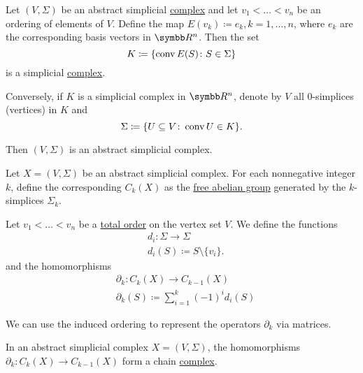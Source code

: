 \begin{Proposition}\label{thm:abstract_simplicial_complex_iff_simplicial_complex}
  Let \( (V, \Sigma) \) be an abstract simplicial \hyperref[def:abstract_simplicial_complex]{complex} and let \( v_1 < \ldots < v_n \) be an ordering of elements of \( V \). Define the map \( E(v_k) \coloneqq e_k, k = 1, \ldots, n \), where \( e_k \) are the corresponding basis vectors in \( \BB{R^n} \). Then the set
  \begin{equation*}
    K \coloneqq \{ \operatorname{conv} E(S) \colon S \in \Sigma \}
  \end{equation*}
  is a simplicial \hyperref[def:simplicial_complex]{complex}.

  Conversely, if \( K \) is a simplicial complex in \( \BB{R^n} \), denote by \( V \) all \( 0 \)-simplices (vertices) in \( K \) and
  \begin{equation*}
    \Sigma \coloneqq \{ U \subseteq V \colon \operatorname{conv} U \in K \}.
  \end{equation*}

  Then \( (V, \Sigma) \) is an abstract simplicial complex.
\end{Proposition}

\begin{Definition}\label{def:group_of_chains}\cite[262]{Carlsson2009}
  Let \( X = (V, \Sigma) \) be an abstract simplicial complex. For each nonnegative integer \( k \), define the corresponding  \( C_k(X) \) as the \hyperref[def:free_abelian_group]{free abelian group} generated by the \( k \)-simplices \( \Sigma_k \).

  Let \( v_1 < \ldots < v_n \) be a \hyperref[def:totally_ordered_set]{total order} on the vertex set \( V \). We define the functions
  \begin{align*}
    &d_i: \Sigma \to \Sigma \\
    &d_i(S) \coloneqq S \setminus \{ v_i \}.
  \end{align*}
  and the homomorphisms
  \begin{align*}
    &\partial_k: C_k(X) \to C_{k-1}(X) \\
    &\partial_k(S) \coloneqq \sum_{i=1}^k (-1)^i d_i(S)
  \end{align*}

  We can use the induced ordering to represent the operators \( \partial_k \) via matrices.
\end{Definition}

\begin{Proposition}\label{def:abstract_simplicial_chain_complex}
  In an abstract simplicial complex \( X = (V, \Sigma) \), the homomorphisms \( \partial_k: C_k(X) \to C_{k-1}(X) \) form a chain \hyperref[def:chain_complex]{complex}.
\end{Proposition}
